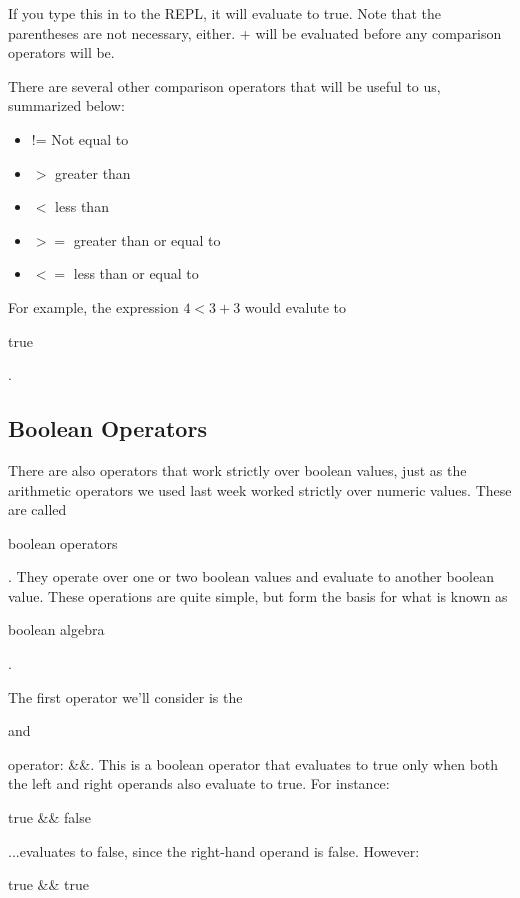 If you type this in to the REPL, it will evaluate to true. Note that the parentheses are not necessary, either. + will be evaluated before any comparison operators will be.

There are several other comparison operators that will be useful to us, summarized below:

\begin{itemize}
\item !=  Not equal to
\item $>$ greater than
\item $<$ less than
\item $>$$=$ greater than or equal to
\item $<$$=$ less than or equal to
\end{itemize}

For example, the expression $4 < 3 + 3$ would evalute to \begin{textit}true\end{textit}. 

\subsection{Boolean Operators}

There are also operators that work strictly over boolean values, just as the arithmetic operators we used last week worked strictly over numeric values. These are called \begin{textbf}boolean operators\end{textbf}. They operate over one or two boolean values and evaluate to another boolean value.  These operations are quite simple, but form the basis for what is known as \begin{textbf}boolean algebra\end{textbf}. 

The first operator we'll consider is the \begin{textit}and\end{textit} operator: \&\&. This is a boolean operator that evaluates to true only when both the left and right operands also evaluate to true. For instance:

\begin{code}

true && false

\end{code}

...evaluates to false, since the right-hand operand is false. However:

\begin{code}

true && true

\end{code}


